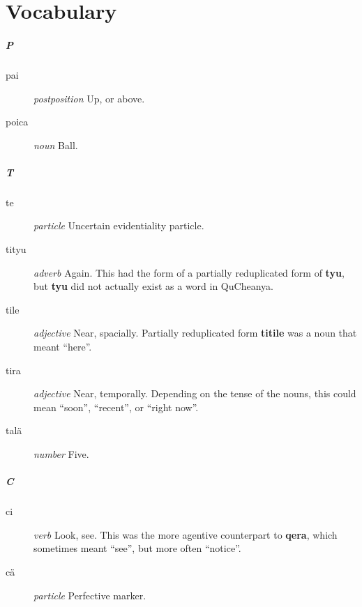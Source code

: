 \documentclass{article}
\begin{document}
\part{Vocabulary}

\subsubsection{P}

\begin{description}
\item [pai] \emph{postposition} Up, or above.
\item [poica] \emph{noun} Ball.
\end{description}

\subsubsection{T}

\begin{description}
\item [te] \emph{particle} Uncertain evidentiality particle.
\item [tityu] \emph{adverb} Again.  This had the form of a partially reduplicated form of \textbf{tyu}, but \textbf{tyu} did not actually exist as a word in QuCheanya.
\item [tile] \emph{adjective} Near, spacially.  Partially reduplicated form \textbf{titile} was a noun that meant ``here''.
\item [tira] \emph{adjective} Near, temporally.  Depending on the tense of the nouns, this could mean ``soon'', ``recent'', or ``right now''.
\item [tal\"a] \emph{number} Five.
\end{description}

\subsubsection{C}

\begin{description}
\item [ci] \emph{verb} Look, see.  This was the more agentive counterpart to \textbf{qera}, which sometimes meant ``see'', but more often ``notice''.
\end{description}

\begin{description}
\item [c\"a] \emph{particle} Perfective marker.
\end{description}
\end{document}
